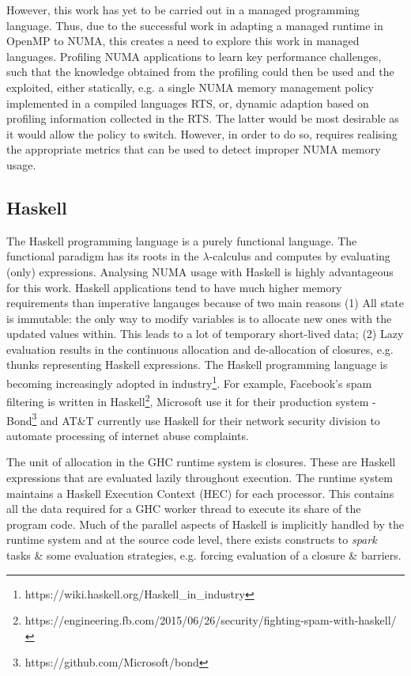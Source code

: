 \documentclass{paper}\usepackage{graphicx}
\begin{document}
However, this work has yet to be carried out in a managed programming language. Thus, due to the successful work in adapting a managed runtime in OpenMP to NUMA, this creates a need to explore this work in managed languages. Profiling NUMA applications to learn key performance challenges, such that the knowledge obtained from the profiling could then be used and the exploited, either statically, e.g. a single NUMA memory management policy implemented in a compiled languages RTS, or, dynamic adaption based on profiling information collected in the RTS. The latter would be most desirable as it would allow the policy to switch. However, in order to do so, requires realising the appropriate metrics that can be used to detect improper NUMA memory usage.

\subsection{Haskell}
\label{sec:haskell}

The Haskell programming language is a purely functional language. The functional paradigm has its roots in the $\lambda$-calculus and computes by evaluating (only) expressions. Analysing NUMA usage with Haskell is highly advantageous for this work. Haskell applications tend to have much higher memory requirements than imperative langauges because of two main reasons (1) All state is immutable: the only way to modify variables is to allocate new ones with the updated values within. This leads to a lot of temporary short-lived data; (2) Lazy evaluation results in the continuous allocation and de-allocation of closures, e.g. thunks representing Haskell expressions. The Haskell programming language is becoming increasingly adopted in industry\footnote{https://wiki.haskell.org/Haskell\_in\_industry}. For example, Facebook's spam filtering is written in Haskell\footnote{https://engineering.fb.com/2015/06/26/security/fighting-spam-with-haskell/}, Microsoft use it for their production system - Bond\footnote{https://github.com/Microsoft/bond} and AT\&T currently use Haskell for their network security division to automate processing of internet abuse complaints.

The unit of allocation in the GHC runtime system is closures. These are Haskell expressions that are evaluated lazily throughout execution. The runtime system maintains a Haskell Execution Context (HEC) for each processor. This contains all the data required for a GHC worker thread to execute its share of the program code. Much of the parallel aspects of Haskell is implicitly handled by the runtime system and at the source code level, there exists constructs to \textit{spark} tasks \& some evaluation strategies, e.g. forcing evaluation of a closure \& barriers.
\end{document}
